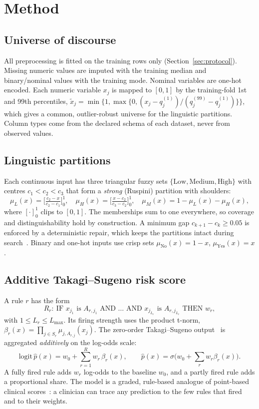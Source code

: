 \section{Method}
\label{sec:method}

\subsection{Universe of discourse}
All preprocessing is fitted on the training rows only (Section~\ref{sec:protocol}).
Missing numeric values are imputed with the training median and binary/nominal values
with the training mode. Nominal variables are one-hot encoded. Each numeric
variable $x_j$ is mapped to $[0,1]$ by the training-fold 1st and 99th percentiles,
$\tilde x_j = \min\{1,\max\{0,(x_j-q^{(1)}_j)/(q^{(99)}_j-q^{(1)}_j)\}\}$, which gives a
common, outlier-robust universe for the linguistic partitions. Column types come from
the declared schema of each dataset, never from observed values.

\subsection{Linguistic partitions}
Each continuous input has three triangular fuzzy sets $\{\text{Low},\text{Medium},\text{High}\}$
with centres $c_1<c_2<c_3$ that form a \emph{strong} (Ruspini) partition with shoulders:
\begin{equation}
\mu_L(x)=\Big[\tfrac{c_2-x}{c_2-c_1}\Big]_0^1,\quad
\mu_H(x)=\Big[\tfrac{x-c_2}{c_3-c_2}\Big]_0^1,\quad
\mu_M(x)=1-\mu_L(x)-\mu_H(x),
\label{eq:partition}
\end{equation}
where $[\cdot]_0^1$ clips to $[0,1]$. The memberships sum to one everywhere, so coverage
and distinguishability hold by construction. A minimum gap $c_{k+1}-c_k\geq0.05$ is
enforced by a deterministic repair, which keeps the partitions intact during
search~\cite{antonelli2011,gacto2011}. Binary and one-hot inputs use crisp sets
$\mu_{\text{No}}(x)=1-x$, $\mu_{\text{Yes}}(x)=x$.

\subsection{Additive Takagi--Sugeno risk score}
A rule $r$ has the form
\[
R_r:\ \text{IF } x_{j_1} \text{ is } A_{r,j_1} \text{ AND } \dots \text{ AND } x_{j_{L_r}} \text{ is } A_{r,j_{L_r}}
\text{ THEN } w_r,
\]
with $1\le L_r\le L_{\max}$. Its firing strength uses the product t-norm,
$\beta_r(x)=\prod_{j\in S_r}\mu_{j,A_{r,j}}(x_j)$. The zero-order Takagi--Sugeno
output~\cite{takagi1985} is aggregated \emph{additively} on the log-odds scale:
\begin{equation}
\mathrm{logit}\,\hat p(x) = w_0 + \sum_{r=1}^{R} w_r\,\beta_r(x),\qquad \hat p(x)=\sigma\!\Big(w_0+\sum_r w_r\beta_r(x)\Big).
\label{eq:score}
\end{equation}
A fully fired rule adds $w_r$ log-odds to the baseline $w_0$, and a partly fired rule
adds a proportional share. The model is a graded, rule-based analogue of point-based
clinical scores~\cite{ustun2016}: a clinician can trace any prediction to the few rules
that fired and to their weights.

